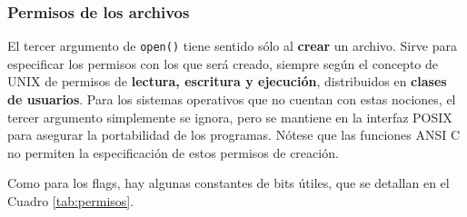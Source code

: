 \subsubsection{Permisos de los archivos}
El tercer argumento de \lstinline{open()} tiene sentido sólo al \textbf{crear} un archivo. Sirve
para especificar los permisos con los que será creado, siempre según el
concepto de UNIX de permisos de \textbf{lectura, escritura y ejecución}, distribuidos en
\textbf{clases de usuarios}. Para los sistemas operativos que no cuentan con estas
nociones, el tercer argumento simplemente se ignora, pero se mantiene en la
interfaz POSIX para asegurar la portabilidad de los programas. Nótese que las funciones ANSI C no permiten la especificación de estos permisos de creación.

Como para los flags, hay algunas constantes de bits útiles, que se detallan en el Cuadro \ref{tab:permisos}.

% 


